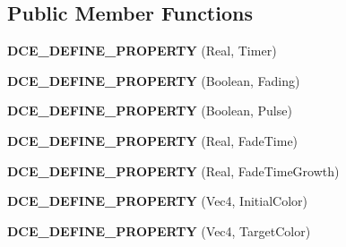 \subsection*{Public Member Functions}
\begin{DoxyCompactItemize}
\item 
\hypertarget{classDCEngine_1_1Components_1_1Fade_a72ee514393dabc4bdaec1877425a215b}{{\bfseries D\-C\-E\-\_\-\-D\-E\-F\-I\-N\-E\-\_\-\-P\-R\-O\-P\-E\-R\-T\-Y} (Real, Timer)}\label{classDCEngine_1_1Components_1_1Fade_a72ee514393dabc4bdaec1877425a215b}

\item 
\hypertarget{classDCEngine_1_1Components_1_1Fade_a96abca8fadc8067ef0aa1c5fdd11a5fc}{{\bfseries D\-C\-E\-\_\-\-D\-E\-F\-I\-N\-E\-\_\-\-P\-R\-O\-P\-E\-R\-T\-Y} (Boolean, Fading)}\label{classDCEngine_1_1Components_1_1Fade_a96abca8fadc8067ef0aa1c5fdd11a5fc}

\item 
\hypertarget{classDCEngine_1_1Components_1_1Fade_a090fd04d573bc97267b9cc39c82ade31}{{\bfseries D\-C\-E\-\_\-\-D\-E\-F\-I\-N\-E\-\_\-\-P\-R\-O\-P\-E\-R\-T\-Y} (Boolean, Pulse)}\label{classDCEngine_1_1Components_1_1Fade_a090fd04d573bc97267b9cc39c82ade31}

\item 
\hypertarget{classDCEngine_1_1Components_1_1Fade_aa30a89a2980efbde889406f7f7ac84d2}{{\bfseries D\-C\-E\-\_\-\-D\-E\-F\-I\-N\-E\-\_\-\-P\-R\-O\-P\-E\-R\-T\-Y} (Real, Fade\-Time)}\label{classDCEngine_1_1Components_1_1Fade_aa30a89a2980efbde889406f7f7ac84d2}

\item 
\hypertarget{classDCEngine_1_1Components_1_1Fade_ab829fda06dc9ce3040ede6eb9ec94a21}{{\bfseries D\-C\-E\-\_\-\-D\-E\-F\-I\-N\-E\-\_\-\-P\-R\-O\-P\-E\-R\-T\-Y} (Real, Fade\-Time\-Growth)}\label{classDCEngine_1_1Components_1_1Fade_ab829fda06dc9ce3040ede6eb9ec94a21}

\item 
\hypertarget{classDCEngine_1_1Components_1_1Fade_a9ad04b433c308b0deca12780136b1e63}{{\bfseries D\-C\-E\-\_\-\-D\-E\-F\-I\-N\-E\-\_\-\-P\-R\-O\-P\-E\-R\-T\-Y} (Vec4, Initial\-Color)}\label{classDCEngine_1_1Components_1_1Fade_a9ad04b433c308b0deca12780136b1e63}

\item 
\hypertarget{classDCEngine_1_1Components_1_1Fade_aefa7a97dab4f86bbbf75d87660527671}{{\bfseries D\-C\-E\-\_\-\-D\-E\-F\-I\-N\-E\-\_\-\-P\-R\-O\-P\-E\-R\-T\-Y} (Vec4, Target\-Color)}\label{classDCEngine_1_1Components_1_1Fade_aefa7a97dab4f86bbbf75d87660527671}


\end{DoxyCompactItemize}
